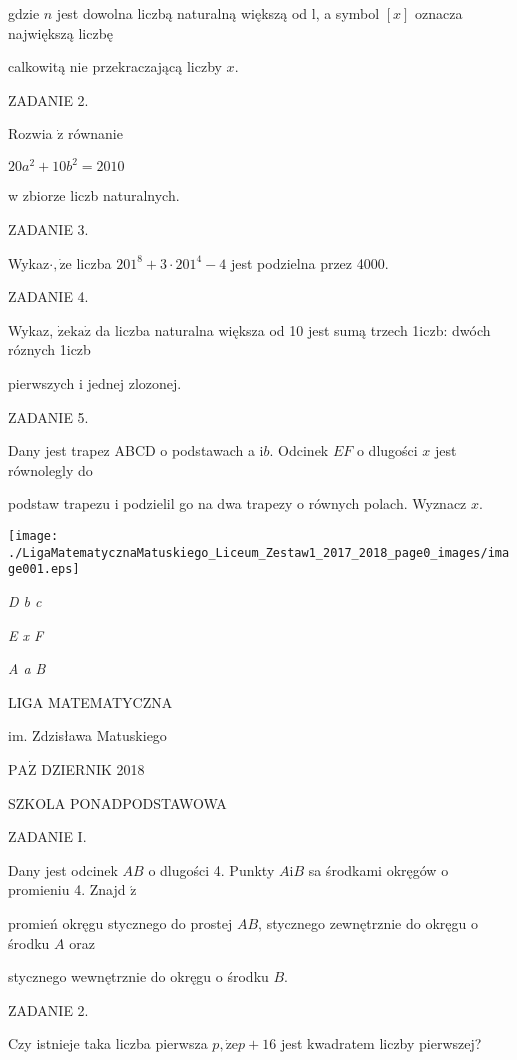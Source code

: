 \documentclass[a4paper,12pt]{article}
\begin{document}
gdzie $n$ jest dowolna liczbą naturalną większą od l, a symbol $[x]$ oznacza największą liczbę

calkowitą nie przekraczającą liczby $x.$

ZADANIE 2.

Rozwia $\dot{\mathrm{z}}$ równanie

$20a^{2}+10b^{2}=2010$

w zbiorze liczb naturalnych.

ZADANIE 3.

Wykaz$\cdot, \dot{\mathrm{z}}\mathrm{e}$ liczba $201^{8}+3\cdot 201^{4}-4$ jest podzielna przez 4000.

ZADANIE 4.

Wykaz, $\dot{\mathrm{z}}\mathrm{e}\mathrm{k}\mathrm{a}\dot{\mathrm{z}}$ da liczba naturalna większa od 10 jest sumą trzech 1iczb: dwóch róznych 1iczb

pierwszych i jednej zlozonej.

ZADANIE 5.

Dany jest trapez ABCD o podstawach a $\mathrm{i} b$. Odcinek $EF$ o dlugości $x$ jest równolegly do

podstaw trapezu i podzielil go na dwa trapezy o równych polach. Wyznacz $x.$
\begin{center}
\texttt{[image: ./LigaMatematycznaMatuskiego\_Liceum\_Zestaw1\_2017\_2018\_page0\_images/image001.eps]}
\end{center}
{\it D  b  c}

{\it E  x  F}

{\it A  a  B}






LIGA MATEMATYCZNA

im. Zdzisława Matuskiego

$\mathrm{P}\mathrm{A}\dot{\mathrm{Z}}$ DZIERNIK 2018

SZKOLA PONADPODSTAWOWA

ZADANIE I.

Dany jest odcinek $AB$ o dlugości 4. Punkty $A\mathrm{i}B$ sa środkami okręgów o promieniu 4. Znajd $\acute{\mathrm{z}}$

promień okręgu stycznego do prostej $AB$, stycznego zewnętrznie do okręgu o środku $A$ oraz

stycznego wewnętrznie do okręgu o środku $B.$

ZADANIE 2.

Czy istnieje taka liczba pierwsza $p, \dot{\mathrm{z}}\mathrm{e}p+16$ jest kwadratem liczby pierwszej?
\end{document}
